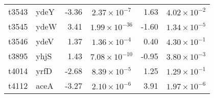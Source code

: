 \begin{table}
\begin{tabular}{ l
    				l
				r
    				c
				r
				c
				}
    t3543 & ydeY & -3.36 & $2.37\times10^{-7}$ & 1.63 & $4.02\times10^{-2}$\\
    t3545 & ydeW & 3.41 & $1.99\times10^{-36}$ & -1.60 & $1.34\times10^{-5}$\\
    t3546 & ydeV & 1.37 & $1.36\times10^{-4}$ & 0.40 & $4.30\times10^{-1}$\\
    t3895 & yhjS & 1.43 & $7.08\times10^{-10}$ & -0.95 & $3.80\times10^{-3}$\\
    t4014 & yrfD & -2.68 & $8.39\times10^{-5}$ & 1.25 & $1.29\times10^{-1}$\\
    t4112 & aceA & -3.27 & $2.10\times10^{-6}$ & 3.91 & $1.97\times10^{-6}$\\
    \bottomrule
    \end{tabular}%
    \label{tab:typhi}%
\end{table}

